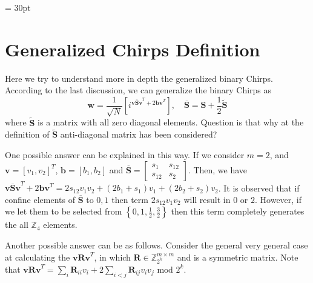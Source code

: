 
\baselineskip = 30pt
\section{Generalized Chirps Definition}
\label{Sec:Int}
\noindent Here we try to understand more in depth the generalized binary Chirps. According to the last discussion, we can generalize the binary Chirps as 
\begin{equation}\label{GenSimChirp}
	\mathbf{w} = \frac{1}{\sqrt{N}}\left[ i^{\mathbf{v \overline{S} v}^T+2\mathbf{b v}^T} \right], \quad \mathbf{\overline{S}}=\mathbf{S}+\frac{1}{2}\mathbf{\mathbf{\tilde{S}}}
\end{equation}
where $\mathbf{\tilde{S}}$ is a matrix with all zero diagonal elements. Question is that why at the definition of $\mathbf{\tilde{S}}$ anti-diagonal matrix has been considered?

\noindent One possible answer can be explained in this way. If we consider $m=2$, and $\mathbf{v}=\left[v_1, v_2\right]^T$, $\mathbf{b}=\left[b_1, b_2\right]$ and $\overline{\mathbf{S}} = \begin{bmatrix}
s_1 & s_{12} \\ s_{12} & s_2	
\end{bmatrix}$. Then, we have $\mathbf{v \overline{S} v}^T+2\mathbf{b v}^T = 2s_{12}v_1v_2+\left(2b_1+s_1\right)v_1+\left(2b_2+s_2\right)v_2$. It is observed that if confine elements of $\mathbf{\overline{S}}$ to $0,1$ then term $2s_{12}v_1v_2$ will result in $0$ or $2$. However, if we let them to be selected from $\left\{0,1,\frac{1}{2}, \frac{3}{2}\right\}$ then this term completely generates the all $\mathbb{Z}_4$ elements.

\noindent Another possible answer can be as follows. Consider the general very general case at calculating the $\mathbf{v R v}^T$, in which $\mathbf{R}\in \mathbb{Z}_{2^k}^{m\times m}$ and is a symmetric matrix. Note that $\mathbf{v R v}^T = \sum_{i}{\mathbf{R}_{ii} v_i}+2\sum_{i<j}{\mathbf{R}_{ij}v_i v_j} \text{  mod  } 2^k$. 


